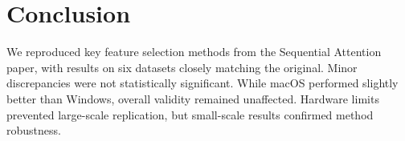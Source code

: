 \documentclass[a4paper,twocolumn]{article} %
\begin{document}
\section{Conclusion}
We reproduced key feature selection methods from the Sequential Attention paper, with results on six datasets closely matching the original. Minor discrepancies were not statistically significant. While macOS performed slightly better than Windows, overall validity remained unaffected. Hardware limits prevented large-scale replication, but small-scale results confirmed method robustness.


\end{document}
